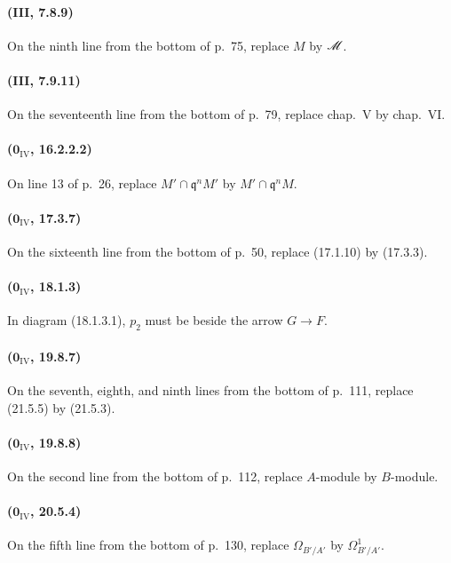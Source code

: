 \paragraph{(\textbf{III}, 7.8.9)}
On the ninth line from the bottom of p.~75, replace $M$ by $\mathscr{M}$.

\paragraph{(\textbf{III}, 7.9.11)}
On the seventeenth line from the bottom of p.~79, replace chap.~V by
chap.~VI.

\paragraph{($\mathbf{0}_{\mathrm{IV}}$, 16.2.2.2)}
On line 13 of p.~26, replace $M'\cap\mathfrak q^nM'$ by
$M'\cap\mathfrak q^nM$.

\paragraph{($\mathbf{0}_{\mathrm{IV}}$, 17.3.7)}
On the sixteenth line from the bottom of p.~50, replace (17.1.10) by
(17.3.3).

\paragraph{($\mathbf{0}_{\mathrm{IV}}$, 18.1.3)}
In diagram (18.1.3.1), $p_2$ must be beside the arrow $G\to F$.

\paragraph{($\mathbf{0}_{\mathrm{IV}}$, 19.8.7)}
On the seventh, eighth, and ninth lines from the bottom of p.~111,
replace (21.5.5) by (21.5.3).

\paragraph{($\mathbf{0}_{\mathrm{IV}}$, 19.8.8)}
On the second line from the bottom of p.~112, replace $A$-module by
$B$-module.

\paragraph{($\mathbf{0}_{\mathrm{IV}}$, 20.5.4)}
On the fifth line from the bottom of p.~130, replace
$\Omega_{B'/A'}$ by $\Omega^1_{B'/A'}$.

